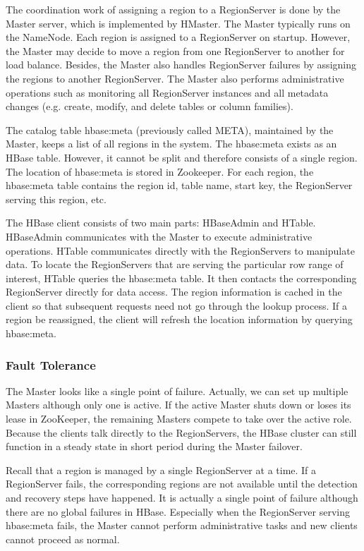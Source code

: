 \documentclass[11pt]{book}
\begin{document}
The coordination work of assigning a region to a RegionServer is done by the Master server, which is implemented by HMaster. The Master typically runs on the NameNode. Each region is assigned to a RegionServer on startup. However, the Master may decide to move a region from one RegionServer to another for load balance. Besides, the Master also handles RegionServer failures by assigning the regions to another RegionServer.  The Master also performs administrative operations such as monitoring all RegionServer instances and all metadata changes (e.g. create, modify, and delete tables or column families).

The catalog table hbase:meta (previously called META), maintained by the Master, keeps a list of all regions in the system. The hbase:meta exists as an HBase table. However, it cannot be split and therefore consists of a single region. The location of hbase:meta is stored in Zookeeper. For each region, the hbase:meta table contains the region id, table name, start key, the RegionServer serving this region, etc.

The HBase client consists of two main parts: HBaseAdmin and HTable. HBaseAdmin communicates with the Master to execute administrative operations. HTable communicates directly with the RegionServers to manipulate data. To locate the RegionServers that are serving the particular row range of interest, HTable queries the hbase:meta table. It then contacts the corresponding RegionServer directly for data access. The region information is cached in the client so that subsequent requests need not go through the lookup process. If a region be reassigned, the client will refresh the location information by querying hbase:meta.

\subsubsection{Fault Tolerance}

The Master looks like a single point of failure. Actually, we can set up multiple Masters although only one is active. If the active Master shuts down or loses its lease in ZooKeeper, the remaining Masters compete to take over the active role. Because the clients talk directly to the RegionServers, the HBase cluster can still function in a steady state in short period during the Master failover.

Recall that a region is managed by a single RegionServer at a time. If a RegionServer fails, the corresponding regions are not available until the detection and recovery steps have happened. It is actually a single point of failure although there are no global failures in HBase. Especially when the RegionServer serving hbase:meta fails, the Master cannot perform administrative tasks and new clients cannot proceed as normal.
\end{document}
